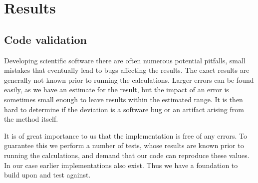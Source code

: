 \chapter{Results}

\section{Code validation}
Developing scientific software there are often numerous potential pitfalls, small mistakes that eventually lead to bugs affecting the results.
The exact results are generally not known prior to running the calculations. 
Larger errors can be found easily, as we have an estimate for the result, but the impact of an error is sometimes small enough to leave results within the estimated range.
It is then hard to determine if the deviation is a software bug or an artifact arising from the method itself.

It is of great importance to us that the implementation is free of any errors.
To guarantee this we perform a number of tests, whose results are known prior to running the calculations, and demand that our code can reproduce these values.
In our case earlier implementations also exist.
Thus we have a foundation to build upon and test against.

